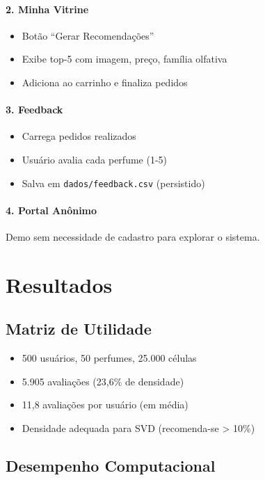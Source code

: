 \documentclass[12pt,a4paper]{article}
\begin{document}
\paragraph{2. Minha Vitrine}
\begin{itemize}
    \item Botão ``Gerar Recomendações''
    \item Exibe top-5 com imagem, preço, família olfativa
    \item Adiciona ao carrinho e finaliza pedidos
\end{itemize}

\paragraph{3. Feedback}
\begin{itemize}
    \item Carrega pedidos realizados
    \item Usuário avalia cada perfume (1-5)
    \item Salva em \texttt{dados/feedback.csv} (persistido)
\end{itemize}

\paragraph{4. Portal Anônimo}
Demo sem necessidade de cadastro para explorar o sistema.

\section{Resultados}

\subsection{Matriz de Utilidade}

\begin{itemize}
    \item 500 usuários, 50 perfumes, 25.000 células
    \item 5.905 avaliações (23,6\% de densidade)
    \item 11,8 avaliações por usuário (em média)
    \item Densidade adequada para SVD (recomenda-se > 10\%)
\end{itemize}

\subsection{Desempenho Computacional}
\end{document}

